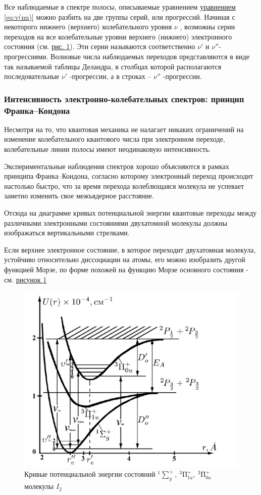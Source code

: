 \documentclass{article}
\begin{document}
Все наблюдаемые в спектре полосы, описываемые уравнением \hyperref[eq:v(nu)]{уравнением \ref*{eq:v(nu)}} можно разбить на две группы серий, или прогрессий. Начиная с некоторого нижнего (верхнего) колебательного уровня $\nu$ , возможны серии переходов на все колебательные уровни верхнего (нижнего) электронного состояния (см. \hyperref[fig:potencialine_krivie]{рис. \ref*{fig:potencialine_krivie}}). Эти серии называются соответственно $\nu'$ и $\nu''$- прогрессиями. Волновые числа наблюдаемых переходов представляются в виде так называемой таблицы Деландра, в столбцах которой располагаются последовательные $\nu'$ -прогрессии, а в строках – $\nu''$ -прогрессии. 
\subsubsection*{Интенсивность  электронно-колебательных  спектров:  принцип Франка–Кондона}
Несмотря на то, что квантовая механика не налагает никаких ограничений на изменение колебательного квантового числа при электронном  переходе,  колебательные  линии  полосы  имеют  неодинаковую интенсивность. 

Экспериментальные  наблюдения  спектров  хорошо объясняются в рамках принципа Франка–Кондона, согласно которому электронный переход происходит настолько быстро, что за время перехода колеблющаяся молекула не успевает заметно изменить свое межъядерное расстояние. 

Отсюда на диаграмме кривых потенциальной энергии квантовые переходы между различными электронными состояниями двухатомной молекулы должны изображаться вертикальными стрелками.

Если верхнее электронное состояние, в которое переходит двухатомная молекула, устойчиво относительно диссоциации на атомы, его можно изобразить другой функцией Морзе, по форме похожей на функцию Морзе основного состояния - см. \hyperref[fig:potencialine_krivie]{рисунок \ref*{fig:potencialine_krivie}}

\begin{figure}[h!]
    \centering
    \includegraphics[scale = 0.6]{Screenshot 2024-02-12 at 11.55.07 AM.png}
    \caption{Кривые потенциальной энергии состояний $^1\sum^+_g ,~ ^3П^+_{1u},~ ^3П^+_{0u}$ молекулы $I_2$}
    \label{fig:potencialine_krivie}
\end{figure}
 \newpage
\end{document}
